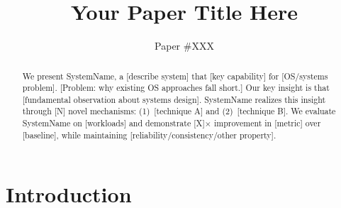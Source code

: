 \documentclass[sigplan,10pt]{acmart}
\newcommand{\system}{SystemName\xspace}
\begin{document}
\title{Your Paper Title Here}

\author{Paper \#XXX}

%

\begin{abstract}
%

We present \system, a [describe system] that [key capability] for
[OS/systems problem].
[Problem: why existing OS approaches fall short.]
Our key insight is that [fundamental observation about systems design].
\system realizes this insight through [N] novel mechanisms:
(1)~[technique A] and (2)~[technique B].
We evaluate \system on [workloads] and demonstrate [X]$\times$
improvement in [metric] over [baseline], while maintaining
[reliability/consistency/other property].
\end{abstract}

\maketitle
\pagestyle{plain}

\section{Introduction}
\label{sec:intro}

%
\end{document}

